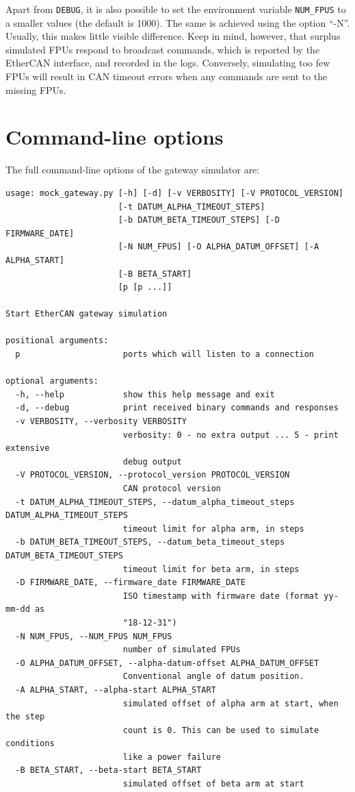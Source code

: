 \documentclass[fontsize=12,a4paper]{scrreprt}
\begin{document}
Apart from \texttt{DEBUG}, it is also possible to set the environment
variable \texttt{NUM\_FPUS} to a smaller values (the default is 1000).
The same is achieved using the option ``-N''.  Usually, this makes
little visible difference. Keep in mind, however, that surplus
simulated FPUs respond to broadcast commands, which is reported by the
EtherCAN interface, and recorded in the logs. Conversely, simulating
too few FPUs will result in CAN timeout errors when any commands are
sent to the missing FPUs.


\section{Command-line options}

The full command-line options of the gateway simulator are:

\begin{verbatim}
usage: mock_gateway.py [-h] [-d] [-v VERBOSITY] [-V PROTOCOL_VERSION]
                       [-t DATUM_ALPHA_TIMEOUT_STEPS]
                       [-b DATUM_BETA_TIMEOUT_STEPS] [-D FIRMWARE_DATE]
                       [-N NUM_FPUS] [-O ALPHA_DATUM_OFFSET] [-A ALPHA_START]
                       [-B BETA_START]
                       [p [p ...]]

Start EtherCAN gateway simulation

positional arguments:
  p                     ports which will listen to a connection

optional arguments:
  -h, --help            show this help message and exit
  -d, --debug           print received binary commands and responses
  -v VERBOSITY, --verbosity VERBOSITY
                        verbosity: 0 - no extra output ... 5 - print extensive
                        debug output
  -V PROTOCOL_VERSION, --protocol_version PROTOCOL_VERSION
                        CAN protocol version
  -t DATUM_ALPHA_TIMEOUT_STEPS, --datum_alpha_timeout_steps DATUM_ALPHA_TIMEOUT_STEPS
                        timeout limit for alpha arm, in steps
  -b DATUM_BETA_TIMEOUT_STEPS, --datum_beta_timeout_steps DATUM_BETA_TIMEOUT_STEPS
                        timeout limit for beta arm, in steps
  -D FIRMWARE_DATE, --firmware_date FIRMWARE_DATE
                        ISO timestamp with firmware date (format yy-mm-dd as
                        "18-12-31")
  -N NUM_FPUS, --NUM_FPUS NUM_FPUS
                        number of simulated FPUs
  -O ALPHA_DATUM_OFFSET, --alpha-datum-offset ALPHA_DATUM_OFFSET
                        Conventional angle of datum position.
  -A ALPHA_START, --alpha-start ALPHA_START
                        simulated offset of alpha arm at start, when the step
                        count is 0. This can be used to simulate conditions
                        like a power failure
  -B BETA_START, --beta-start BETA_START
                        simulated offset of beta arm at start
\end{verbatim}
\end{document}
